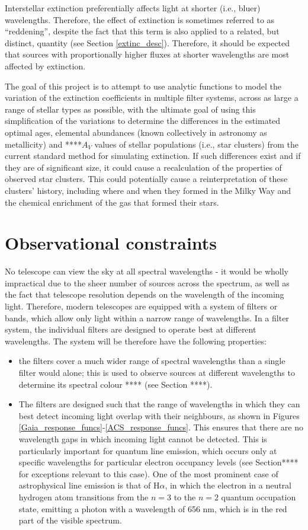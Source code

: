 \documentclass[12pt, a4paper]{report}
\begin{document}
Interstellar extinction preferentially affects light at shorter (i.e., bluer) wavelengths. Therefore, the effect of extinction is sometimes referred to as ``reddening'', despite the fact that this term is also applied to a related, but distinct, quantity (see Section \ref{extinc_desc}). Therefore, it should be expected that sources with proportionally higher fluxes at shorter wavelengths are most affected by extinction.

The goal of this project is to attempt to use analytic functions to model the variation of the extinction coefficients in multiple filter systems, across as large a range of stellar types as possible, with the ultimate goal of using this simplification of the variations to determine the differences in the estimated optimal ages, elemental abundances (known collectively in astronomy as metallicity) and ****$A_{V}$ values of stellar populations (i.e., star clusters) from the current standard method for simulating extinction. If such differences exist and if they are of significant size, it could cause a recalculation of the properties of observed star clusters. This could potentially cause a reinterpretation of these clusters' history, including where and when they formed in the Milky Way and the chemical enrichment of the gas that formed their stars.

\section{Observational constraints}
No telescope can view the sky at all spectral wavelengths - it would be wholly impractical due to the sheer number of sources across the spectrum, as well as the fact that telescope resolution depends on the wavelength of the incoming light. Therefore, modern telescopes are equipped with a system of filters or bands, which allow only light within a narrow range of wavelengths. In a filter system, the individual filters are designed to operate best at different wavelengths. The system will be therefore have the following properties:

\begin{itemize}
\item the filters cover a much wider range of spectral wavelengths than a single filter would alone; this is used to observe sources at different wavelengths to determine its spectral colour **** (see Section ****).
\item The filters are designed such that the range of wavelengths in which they can best detect incoming light overlap with their neighbours, as shown in Figures \ref{Gaia_response_funcs}-\ref{ACS_response_funcs}. This ensures that there are no wavelength gaps in which incoming light cannot be detected. This is particularly important for quantum line emission, which occurs only at specific wavelengths for particular electron occupancy levels (see Section**** for exceptions relevant to this case). One of the most prominent case of astrophysical line emission is that of H$\alpha$, in which the electron in a neutral hydrogen atom transitions from the $n = 3$ to the $n = 2$ quantum occupation state, emitting a photon with a wavelength of 656 nm, which is in the red part of the visible spectrum.
\end{itemize}
\end{document}
